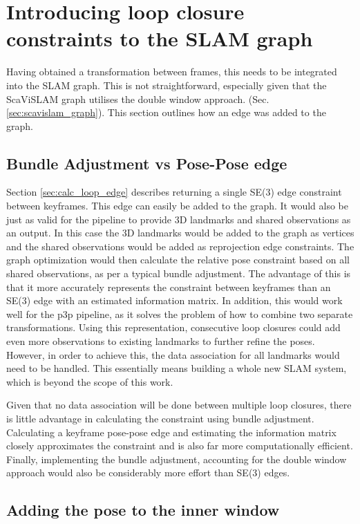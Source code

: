 \section{Introducing loop closure constraints to the SLAM graph}

Having obtained a transformation between frames, this needs to be integrated into the SLAM graph.  This is not straightforward, especially given that the ScaViSLAM graph utilises the double window approach.  (Sec. \ref{sec:scavislam_graph}).  This section outlines how an edge was added to the graph.

\subsection{Bundle Adjustment vs Pose-Pose edge}

Section \ref{sec:calc_loop_edge} describes returning a single SE(3) edge constraint between keyframes.  This edge can easily be added to the graph.  It would also be just as valid for the pipeline to provide 3D landmarks and shared observations as an output.  In this case the 3D landmarks would be added to the graph as vertices and the shared observations would be added as reprojection edge constraints.  The graph optimization would then calculate the relative pose constraint based on all shared observations, as per a typical bundle adjustment.  The advantage of this is that it more accurately represents the constraint between keyframes than an SE(3) edge  with an estimated information matrix.  In addition, this would work well for the p3p pipeline, as it solves the problem of how to combine two separate transformations.  Using this representation, consecutive loop closures could add even more observations to existing landmarks to further refine the poses.  However, in order to achieve this, the data association for all landmarks would need to be handled.  This essentially means building a whole new SLAM system, which is beyond the scope of this work.

Given that no data association will be done between multiple loop closures, there is little advantage in calculating the constraint using bundle adjustment.  Calculating a keyframe pose-pose edge and estimating the information matrix closely approximates the constraint and is also far more computationally efficient.  Finally, implementing the bundle adjustment, accounting for the double window approach would also be considerably more effort than SE(3) edges.

\subsection{Adding the pose to the inner window}

